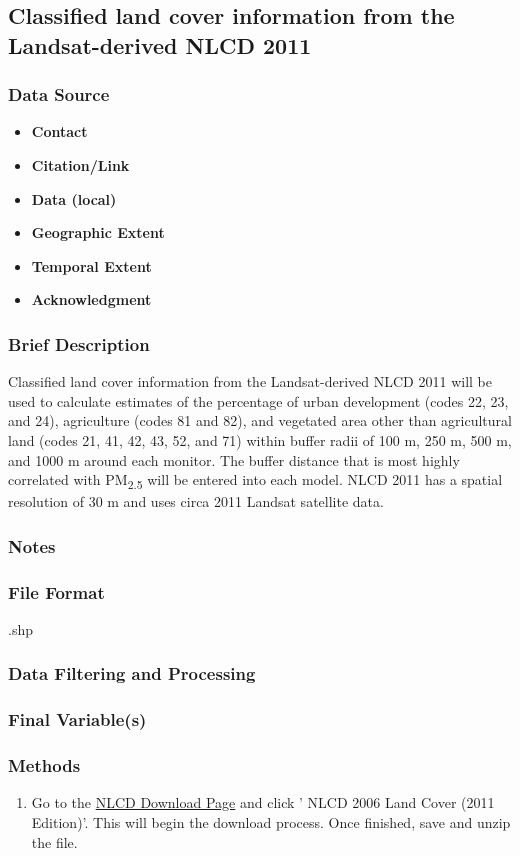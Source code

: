 \subsection{Classified land cover information from the Landsat-derived NLCD 2011}
\subsubsection*{Data Source}
\begin{itemize}[nolistsep]
\item \textbf{Contact}
\item \textbf{Citation/Link}
\item \textbf{Data (local)}
\item \textbf{Geographic Extent}
\item \textbf{Temporal Extent}
\item \textbf{Acknowledgment}
\end{itemize}
\subsubsection*{Brief Description}

Classified land cover information from the Landsat-derived NLCD 2011 
\citep{Homer2017} will be used to calculate estimates of the percentage of urban development (codes 22, 23, and 24), agriculture (codes 81 and 82), and vegetated area other than agricultural land (codes 21, 41, 42, 43, 52, and 71) within buffer radii of 100 m, 250 m, 500 m, and 1000 m around each monitor. The buffer distance that is most highly correlated with PM\textsubscript{2.5} will be entered into each model. NLCD 2011 has a spatial resolution of 30 m and uses circa 2011 Landsat satellite data. 

\subsubsection*{Notes}
\subsubsection*{File Format} .shp
\subsubsection*{Data Filtering and Processing}
\subsubsection*{Final Variable(s)}
\subsubsection*{Methods}
\begin{enumerate}
\item Go to the \href{https://www.mrlc.gov/nlcd06_data.php}{NLCD Download Page} and click '	NLCD 2006 Land Cover (2011 Edition)'. This will begin the download process. Once finished, save and unzip the file.
\end{enumerate}
